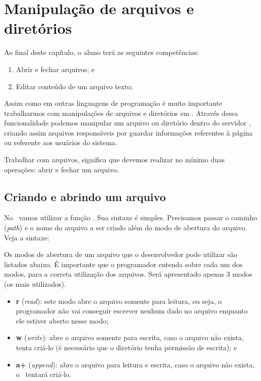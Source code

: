 \chapter{Manipulação de arquivos e diretórios}
\label{manipulacao-de-arquivos-e-diretorios}

Ao final deste capítulo, o aluno terá as seguintes competências:
\begin{enumerate}
    \item Abrir e fechar arquivos; e
    \item Editar conteúdo de um arquivo texto;
\end{enumerate}

Assim como em outras linguagens de programação é muito importante trabalharmos 
com manipulações de arquivos e diretórios em \php. Através dessa funcionalidade 
podemos manipular um arquivo ou diretório dentro do servidor \web, criando assim
arquivos responsáveis por guardar informações referentes à página ou referente
aos usuários do sistema. 

Trabalhar com arquivos, significa que devemos realizar no mínimo duas operações: 
abrir e fechar um arquivo.

\section{Criando e abrindo um arquivo}
\label{criando-e-abrindo-um-arquivo}

No \php~vamos utilizar a função \funcaofopen. Sua sintaxe é simples. Precisamos
passar o caminho (\textit{path}) e o nome do arquivo a ser criado além do modo de
abertura do arquivo. Veja a sintaxe:



Os modos de abertura de um arquivo que o desenvolvedor pode utilizar são listados
abaixo. É importante que o programador entenda sobre cada um dos modos, para a 
correta utilização dos arquivos. Será apresentado apenas 3 modos (os mais utilizados).

\begin{itemize}
  \item \textbf{r} (\textit{read}): este modo abre o arquivo somente para leitura,
  ou seja, o programador não vai conseguir escrever nenhum dado no arquivo enquanto
  ele estiver aberto nesse modo;
  \item \textbf{w} (\textit{write}): abre o arquivo somente para escrita, caso o 
  arquivo não exista, tenta criá-lo (é necessário que o diretório tenha permissão
  de escrita); e
  \item \textbf{a+} (\textit{append}): abre o arquivo para leitura e escrita, 
  caso o arquivo não exista, o \php~tentará criá-lo.  
\end{itemize}

